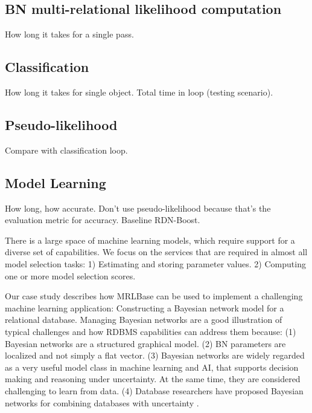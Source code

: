 \documentclass{acm_proc_article-sp}
\begin{document}
\subsection{BN multi-relational likelihood computation}

How long it takes for a single pass.

\subsection{Classification}

How long it takes for single object. Total time in loop (testing scenario).

\subsection{Pseudo-likelihood}

Compare with classification loop.

\subsection{Model Learning}

How long, how accurate. Don't use pseudo-likelihood because that's the evaluation metric for accuracy. Baseline RDN-Boost. 

There is a large space of machine learning models, which require support for a diverse set of capabilities. We focus on the services that are required in almost all model selection tasks: 1) Estimating and storing parameter values. 2) Computing one or more model selection scores. %

Our case study describes how MRLBase can be used to implement a challenging machine learning application: Constructing a Bayesian network model for a relational database. 
Managing Bayesian networks are a good illustration of typical challenges and how RDBMS capabilities can address them because: (1) Bayesian networks are a structured graphical model. (2) BN parameters are localized and not simply a flat vector. (3) Bayesian networks are widely regarded as a very useful model class in machine learning and AI, that supports decision making and reasoning under uncertainty. At the same time, they are considered challenging to learn from data. (4) Database researchers have proposed Bayesian networks for combining databases with uncertainty \cite{Wang2008,Deshpande2007}. 
%
\end{document}
